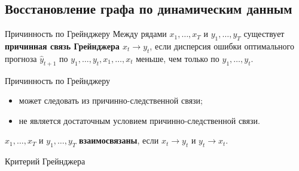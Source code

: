 \documentclass[9pt,pdf,utf8,hyperref={unicode},aspectratio=169]{beamer}
\begin{document}
\subsection{Восстановление графа по динамическим данным}
\begin{frame}{Причинность по Грейнджеру}
    Между рядами $x_1,\dots,x_T$ и $y_1,\dots,y_T$ существует \textbf{причинная связь Грейнджера $x_t \rightarrow y_t$}, если дисперсия ошибки оптимального прогноза $\hat{y}_{t+1}$ по $y_1,\dots,y_t,x_1,\dots,x_t$ меньше, чем только по $y_1,\dots,y_t$.

    \bigskip

Причинность по Грейнджеру
\begin{itemize}
	\item может следовать из причинно-следственной связи;
	\item не является достаточным условием причинно-следственной связи.
\end{itemize}
     
    \bigskip

    $x_1,\dots,x_T$ и $y_1,\dots,y_T$ \textbf{взаимосвязаны}, если $x_t \rightarrow y_t$ и $y_t \rightarrow x_t$.
\end{frame}

\begin{frame}{Критерий Грейнджера}
\end{frame}
\end{document}
